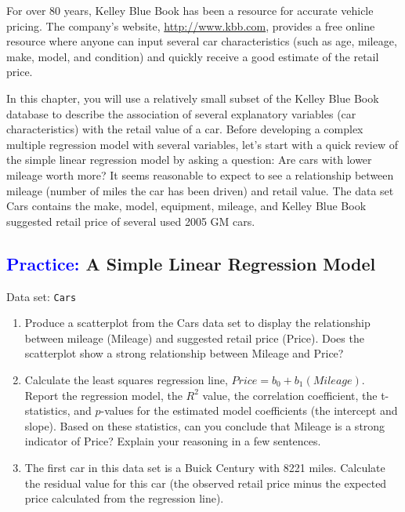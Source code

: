 \documentclass[
]{report}
\begin{document}
For over 80 years, Kelley Blue Book has been a resource for accurate vehicle pricing. The company's website, \url{http://www.kbb.com}, provides a free online resource where anyone can input several car characteristics (such as age, mileage, make, model, and condition) and quickly receive a good estimate of the retail price.

In this chapter, you will use a relatively small subset of the Kelley Blue Book database to describe the association of several explanatory variables (car characteristics) with the retail value of a car. Before developing a complex multiple regression model with several variables, let's start with a quick review of the simple linear regression model by asking a question: Are cars with lower mileage worth more? It seems reasonable
to expect to see a relationship between mileage (number of miles the car has been driven) and retail value. The data set Cars contains the make, model, equipment, mileage, and Kelley Blue Book suggested retail price of several used 2005 GM cars.

\hypertarget{a-simple-linear-regression-model}{%
\subsection*{\texorpdfstring{\textcolor{blue}{Practice:} A Simple Linear Regression Model}{ A Simple Linear Regression Model}}\label{a-simple-linear-regression-model}}

\vspace{-1em}

Data set: \texttt{Cars}

\begin{enumerate}
\def\labelenumi{\arabic{enumi}.}
\item
  Produce a scatterplot from the Cars data set to display the relationship between mileage (Mileage) and suggested retail price (Price). Does the scatterplot show a strong relationship between Mileage and Price?
\item
  Calculate the least squares regression line, \(\scriptstyle Price = b_0 + b_1(Mileage)\). Report the regression model, the \(\scriptstyle {R}^2\) value, the correlation coefficient, the t-statistics, and \(\scriptstyle p\)-values for the estimated model coefficients (the intercept and slope). Based on these statistics, can you conclude that Mileage is a strong indicator of Price? Explain your reasoning in a few sentences.
\item
  The first car in this data set is a Buick Century with 8221 miles. Calculate the residual value for this car (the observed retail price minus the expected price calculated from the regression line).
\end{enumerate}
\end{document}
